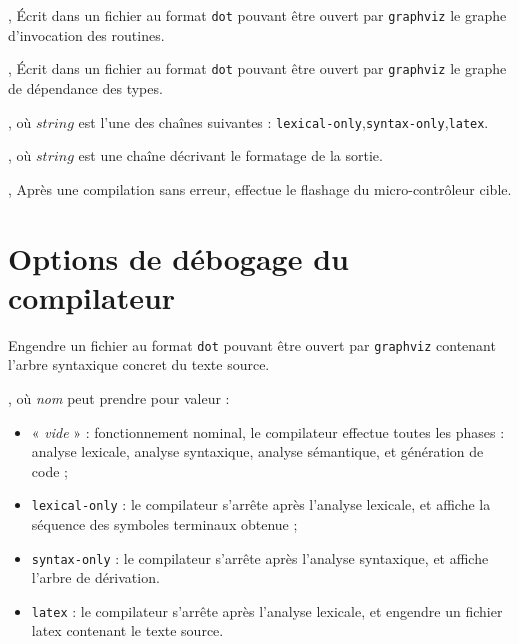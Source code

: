 ,  Écrit dans un fichier au format \texttt{dot}  pouvant être ouvert par \texttt{graphviz} le graphe d'invocation des routines.

,  Écrit dans un fichier au format \texttt{dot}  pouvant être ouvert par \texttt{graphviz} le graphe de dépendance des types.

, où $string$ est l'une des chaînes suivantes : \texttt{lexical-only},\texttt{syntax-only},\texttt{latex}.

, où $string$ est une chaîne décrivant le formatage de la sortie.











,  Après une compilation sans erreur, effectue le flashage du micro-contrôleur cible.



\section{Options de débogage du compilateur}


 Engendre un fichier au format \texttt{dot} pouvant être ouvert par \texttt{graphviz} contenant l'arbre syntaxique concret du texte source.


, où \emph{nom} peut prendre pour valeur :
\begin{itemize}
  \item « \emph{vide} » : fonctionnement nominal, le compilateur effectue toutes les phases : analyse lexicale, analyse syntaxique, analyse sémantique, et génération de code ;
  \item \texttt{lexical-only} : le compilateur s'arrête après l'analyse lexicale, et affiche la séquence des symboles terminaux obtenue ;
  \item \texttt{syntax-only} : le compilateur s'arrête après l'analyse syntaxique, et affiche l'arbre de dérivation.
  \item \texttt{latex} : le compilateur s'arrête après l'analyse lexicale, et engendre un fichier latex contenant le texte source.
\end{itemize}

